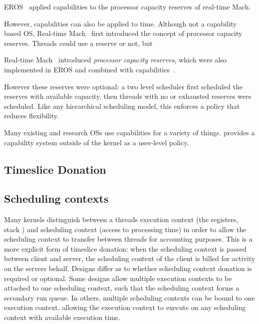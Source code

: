 EROS~\citep{Shapiro_SF_99} applied capabilities to the processor capacity reserves of real-time
Mach. 



However, capabilities can also be applied to time. Although not a capability based \gls{OS}, 
Real-time Mach~\citep{Mercer_RZ_94, Mercer_ST_93} first introduced the concept of
processor capacity reserves. Threads could use a reserve or not, but


Real-time Mach~\citep{Mercer_ST_93} introduced
\emph{processor capacity reserves}, which were also implemented in EROS and combined with
capabilities~\citep{Shapiro_SF_99}.

However these reserves were optional: a two level scheduler first
scheduled the reserves with available capacity, then threads with no
or exhausted reserves were scheduled.
Like any hierarchical scheduling model, this enforces a policy that
reduces flexibility.


Many existing and research \glspl{OS} use capabilities for a variety of things. \composite provides
a capability system outside of the kernel as a user-level policy.

\subsection{Timeslice Donation}




\subsection{Scheduling contexts}

Many kernels distinguish between a threads execution context (the registers, stack \etc) and
scheduling context (access to processing time) in order to allow the scheduling context to transfer
between threads for accounting purposes.  This is a more explicit form of timeslice donation: when
the scheduling context is passed between client and server, the scheduling context of the client is
billed for activity on the servers behalf.  Designs differ as to whether scheduling context donation
is required or optional.  Some designs allow multiple execution contexts to be attached to one
scheduling context, such that the scheduling context forms a secondary run queue.  In others,
multiple scheduling contexts can be bound to one execution context, allowing the execution context
to execute on any scheduling context with available execution time. 

